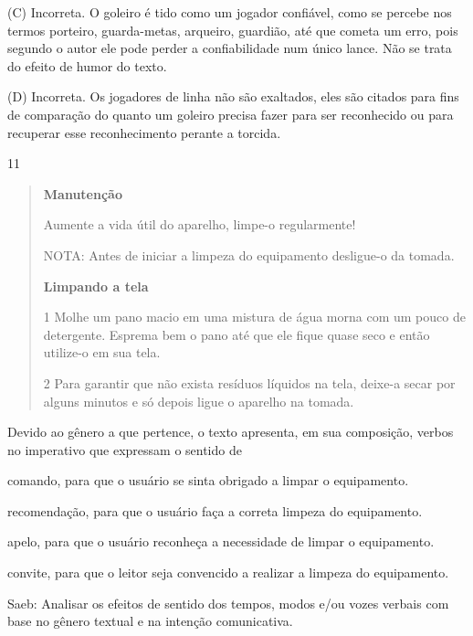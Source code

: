 (C) Incorreta. O goleiro é tido como um jogador confiável, como se
percebe nos termos porteiro, guarda-metas, arqueiro, guardião, até que
cometa um erro, pois segundo o autor ele pode perder a confiabilidade
num único lance. Não se trata do efeito de humor do texto.

(D) Incorreta. Os jogadores de linha não são exaltados, eles são citados
para fins de comparação do quanto um goleiro precisa fazer para ser
reconhecido ou para recuperar esse reconhecimento perante a torcida.

\num{11}

\begin{quote}\textbf{Manutenção}

Aumente a vida útil do aparelho, limpe-o regularmente!

NOTA: Antes de iniciar a limpeza do equipamento desligue-o da tomada.

\textbf{Limpando a tela}

\num{1} Molhe um pano macio em uma mistura de água morna com um pouco de
detergente. Esprema bem o pano até que ele fique quase seco e então
utilize-o em sua tela.

\num{2} Para garantir que não exista resíduos líquidos na tela, deixe-a
secar por alguns minutos e só depois ligue o aparelho na tomada.
\end{quote}


Devido ao gênero a que pertence, o texto apresenta, em sua composição,
verbos no imperativo que expressam o sentido de

\begin{escolha}
\item comando, para que o usuário se sinta obrigado a limpar o equipamento.

\item recomendação, para que o usuário faça a correta limpeza do
equipamento.

\item apelo, para que o usuário reconheça a necessidade de limpar o
equipamento.

\item convite, para que o leitor seja convencido a realizar a limpeza do
equipamento.
\end{escolha}

Saeb: Analisar os efeitos de sentido dos tempos, modos e/ou vozes
verbais com base no gênero textual e na intenção comunicativa.

